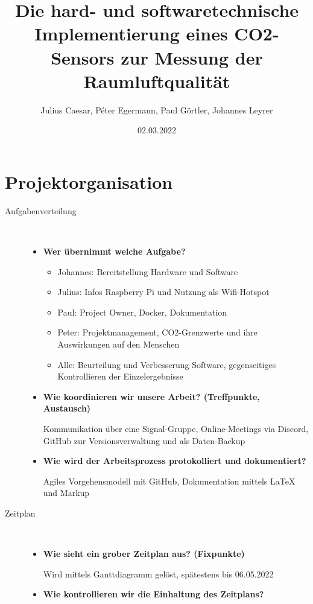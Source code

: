 \documentclass[a4paper,
    11pt,
    headings=small,
    ngerman,
    listof=totoc,
    numbers=noenddot]{scrreprt}[2021/11/13]
\title{Die hard- und softwaretechnische Implementierung eines CO2-Sensors zur Messung der Raumluftqualität}
\author{Julius Caesar, Péter Egermann, Paul Görtler, Johannes Leyrer}
\date{02.03.2022}
\begin{document}
\maketitle


\chapter{Projektorganisation}

\begin{description}
  \item[Aufgabenverteilung] \
        \begin{itemize}
          \item \textbf{Wer übernimmt welche Aufgabe?}
                \begin{itemize}
                  \item Johannes: Bereitstellung Hardware und Software
                  \item Julius: Infos Raspberry Pi und Nutzung als Wifi-Hotspot
                  \item Paul: Project Owner, Docker, Dokumentation
                  \item Peter: Projektmanagement, CO2-Grenzwerte und ihre Auswirkungen auf den Menschen
                  \item Alle: Beurteilung und Verbesserung Software, gegenseitiges Kontrollieren der Einzelergebnisse
                \end{itemize}
          \item \textbf{Wie koordinieren wir unsere Arbeit? (Treffpunkte, Austausch)}

                Kommunikation über eine Signal-Gruppe, Online-Meetings via Discord, GitHub zur Versionsverwaltung und als Daten-Backup

          \item \textbf{Wie wird der Arbeitsprozess protokolliert und dokumentiert?}

                Agiles Vorgehensmodell mit GitHub, Dokumentation mittels LaTeX und Markup
        \end{itemize}
  \item[Zeitplan] \
        \begin{itemize}
          \item \textbf{Wie sieht ein grober Zeitplan aus? (Fixpunkte)}

                Wird mittels Ganttdiagramm gelöst, spätestens bis 06.05.2022

          \item \textbf{Wie kontrollieren wir die Einhaltung des Zeitplans?}


\end{itemize}
\end{description}
\end{document}
